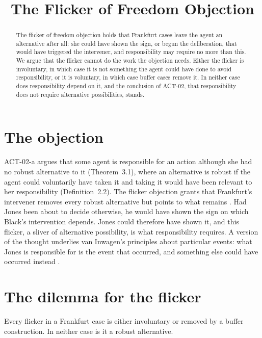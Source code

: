 \documentclass{situationist-preprint}
\title{The Flicker of Freedom Objection}
\begin{document}
\maketitle

\begin{abstract}
The flicker of freedom objection holds that Frankfurt cases leave the agent an alternative after all: she could have shown the sign, or begun the deliberation, that would have triggered the intervener, and responsibility may require no more than this. We argue that the flicker cannot do the work the objection needs. Either the flicker is involuntary, in which case it is not something the agent could have done to avoid responsibility, or it is voluntary, in which case buffer cases remove it. In neither case does responsibility depend on it, and the conclusion of ACT-02, that responsibility does not require alternative possibilities, stands.
\end{abstract}

\section{The objection}

ACT-02-a argues that some agent is responsible for an action although she had no robust alternative to it (Theorem~3.1), where an alternative is robust if the agent could voluntarily have taken it and taking it would have been relevant to her responsibility (Definition~2.2). The flicker objection grants that Frankfurt's intervener removes every robust alternative but points to what remains \citep{Fischer1994}. Had Jones been about to decide otherwise, he would have shown the sign on which Black's intervention depends. Jones could therefore have shown it, and this flicker, a sliver of alternative possibility, is what responsibility requires. A version of the thought underlies van Inwagen's principles about particular events: what Jones is responsible for is the event that occurred, and something else could have occurred instead \citep{vanInwagen1978}.

\section{The dilemma for the flicker}

\begin{proposition}\label{p:dilemma}
Every flicker in a Frankfurt case is either involuntary or removed by a buffer construction. In neither case is it a robust alternative.
\end{proposition}
\end{document}
